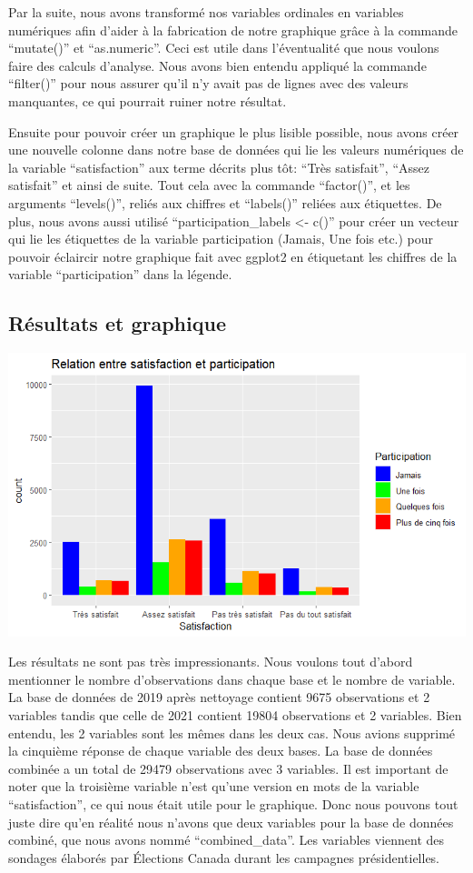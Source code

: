 \documentclass[
  letterpaper,
  DIV=11,
  numbers=noendperiod]{scrartcl}
\begin{document}
Par la suite, nous avons transformé nos variables ordinales en variables
numériques afin d'aider à la fabrication de notre graphique grâce à la
commande ``mutate()'' et ``as.numeric''. Ceci est utile dans
l'éventualité que nous voulons faire des calculs d'analyse. Nous avons
bien entendu appliqué la commande ``filter()'' pour nous assurer qu'il
n'y avait pas de lignes avec des valeurs manquantes, ce qui pourrait
ruiner notre résultat.

Ensuite pour pouvoir créer un graphique le plus lisible possible, nous
avons créer une nouvelle colonne dans notre base de données qui lie les
valeurs numériques de la variable ``satisfaction'' aux terme décrits
plus tôt: ``Très satisfait'', ``Assez satisfait'' et ainsi de suite.
Tout cela avec la commande ``factor()'', et les arguments ``levels()'',
reliés aux chiffres et ``labels()'' reliées aux étiquettes. De plus,
nous avons aussi utilisé ``participation\_labels \textless- c()'' pour
créer un vecteur qui lie les étiquettes de la variable participation
(Jamais, Une fois etc.) pour pouvoir éclaircir notre graphique fait avec
ggplot2 en étiquetant les chiffres de la variable ``participation'' dans
la légende.

\hypertarget{ruxe9sultats-et-graphique}{%
\subsection{Résultats et graphique}\label{ruxe9sultats-et-graphique}}

\includegraphics{graphiqueTP2.png}

Les résultats ne sont pas très impressionants. Nous voulons tout d'abord
mentionner le nombre d'observations dans chaque base et le nombre de
variable. La base de données de 2019 après nettoyage contient 9675
observations et 2 variables tandis que celle de 2021 contient 19804
observations et 2 variables. Bien entendu, les 2 variables sont les
mêmes dans les deux cas. Nous avions supprimé la cinquième réponse de
chaque variable des deux bases. La base de données combinée a un total
de 29479 observations avec 3 variables. Il est important de noter que la
troisième variable n'est qu'une version en mots de la variable
``satisfaction'', ce qui nous était utile pour le graphique. Donc nous
pouvons tout juste dire qu'en réalité nous n'avons que deux variables
pour la base de données combiné, que nous avons nommé
``combined\_data''. Les variables viennent des sondages élaborés par
Élections Canada durant les campagnes présidentielles.
\end{document}

